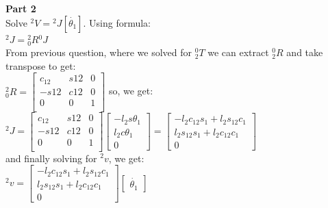 \documentclass{article}
\begin{document}
\textbf{Part 2}\\
Solve ${}^2V={}^2J[\dot{\theta_1}]$. Using formula:\\
${}^2J={}^2_0 R {}^0J$\\
From previous question, where we solved for ${}^0_2 T$ we can extract ${}^0_2 R$ and take transpose to get:\\
${}^2_0 R=\begin{bmatrix}
c_{12} & s{12} & 0 \\
-s{12} & c{12} & 0 \\
0 & 0 & 1\\
\end{bmatrix}$ so, we get:\\
${}^2J=\begin{bmatrix}
c_{12} & s{12} & 0 \\
-s{12} & c{12} & 0 \\
0 & 0 & 1\\
\end{bmatrix}
\begin{bmatrix}
-l_2s\theta_1\\
l_2c\theta_1\\
0
\end{bmatrix}=
\begin{bmatrix}
-l_2c_{12}s_1 + l_2s_{12}c_1\\
l_2s_{12}s_1 + l_2c_{12}c_1\\
0
\end{bmatrix}$\\ and finally solving for ${}^2v$, we get:\\
${}^2v=\begin{bmatrix}
-l_2c_{12}s_1 + l_2s_{12}c_1\\
l_2s_{12}s_1 + l_2c_{12}c_1\\
0
\end{bmatrix}\begin{bmatrix}
\dot{\theta_1}
\end{bmatrix}$\\\\
\end{document}
